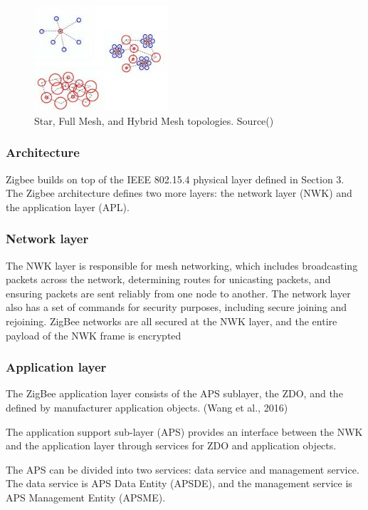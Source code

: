 \begin{figure}[!ht]
    \centering
    \includegraphics[width=50mm, keepaspectratio]{figures/zigbee-topology-ug103-02-fundamentals-zigbee.jpg}
    \caption{Star, Full Mesh, and Hybrid Mesh topologies. Source(\cite{zigbee:silabs:ug103:2})}
    \label{zb:network:topologie}
\end{figure}

\subsubsection{Architecture}

Zigbee builds on top of the IEEE 802.15.4 physical layer defined in Section 3. The Zigbee architecture defines two more layers: the network layer (NWK) and the application layer (APL).

\subsubsection{Network layer}

The NWK layer is responsible for mesh networking, which includes broadcasting packets across the network, determining routes for unicasting packets, and ensuring packets are sent reliably from one node to another. The network layer also has a set of commands for security purposes, including secure joining and rejoining. ZigBee networks are all secured at the NWK layer, and the entire payload of the NWK frame is encrypted

\subsubsection{Application layer}

The ZigBee application layer consists of the APS sublayer, the ZDO, and the deﬁned by manufacturer application objects. (Wang et al., 2016)
\cite{nxp:2016}

The application support sub-layer (APS) provides an interface between the NWK and the application layer through services for ZDO and application objects.

The APS can be divided into two services: data service and management service. The data service is APS Data Entity (APSDE), and the management service is APS Management Entity (APSME).

